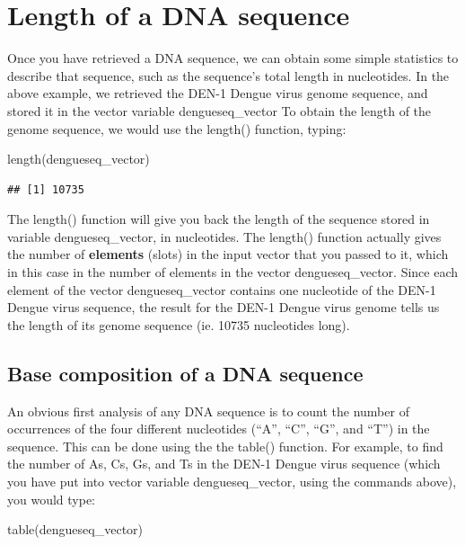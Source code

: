 \documentclass[
]{book}
\newenvironment{Shaded}{\begin{snugshade}}{\end{snugshade}}
\newcommand{\FunctionTok}[1]{\textcolor[rgb]{0.00,0.00,0.00}{#1}}
\newcommand{\NormalTok}[1]{#1}
\begin{document}
\hypertarget{length-of-a-dna-sequence}{%
\section{Length of a DNA sequence}\label{length-of-a-dna-sequence}}

Once you have retrieved a DNA sequence, we can obtain some simple statistics to describe that sequence, such as the sequence's total length in nucleotides. In the above example, we retrieved the DEN-1 Dengue virus genome sequence, and stored it in the vector variable dengueseq\_vector To obtain the length of the genome sequence, we would use the length() function, typing:

\begin{Shaded}
\begin{Highlighting}[]
\FunctionTok{length}\NormalTok{(dengueseq\_vector)}
\end{Highlighting}
\end{Shaded}

\begin{verbatim}
## [1] 10735
\end{verbatim}

The length() function will give you back the length of the sequence stored in variable dengueseq\_vector, in nucleotides. The length() function actually gives the number of \textbf{elements} (slots) in the input vector that you passed to it, which in this case in the number of elements in the vector dengueseq\_vector. Since each element of the vector dengueseq\_vector contains one nucleotide of the DEN-1 Dengue virus sequence, the result for the DEN-1 Dengue virus genome tells us the length of its genome sequence (ie. 10735 nucleotides long).

\hypertarget{base-composition-of-a-dna-sequence}{%
\subsection{Base composition of a DNA sequence}\label{base-composition-of-a-dna-sequence}}

An obvious first analysis of any DNA sequence is to count the number of occurrences of the four different nucleotides (``A'', ``C'', ``G'', and ``T'') in the sequence. This can be done using the the table() function. For example, to find the number of As, Cs, Gs, and Ts in the DEN-1 Dengue virus sequence (which you have put into vector variable dengueseq\_vector, using the commands above), you would type:

\begin{Shaded}
\begin{Highlighting}[]
\FunctionTok{table}\NormalTok{(dengueseq\_vector)}
\end{Highlighting}
\end{Shaded}
\end{document}
